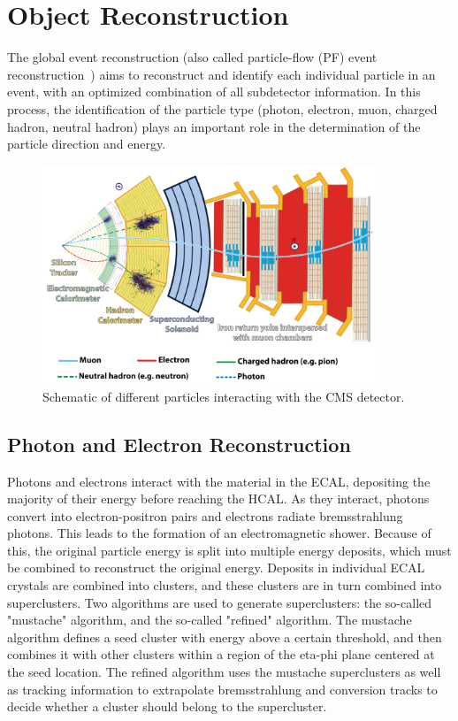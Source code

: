 \section{Object Reconstruction}
The global event reconstruction (also called particle-flow (PF) event reconstruction~\cite{CMS:2017yfk}) aims to reconstruct and identify each individual particle in an event, with an optimized combination of all subdetector information. In this process, the identification of the particle type (photon, electron, muon, charged hadron, neutral hadron) plays an important role in the determination of the particle direction and energy.

\begin{figure}[tb]
  \centering
   \includegraphics[width=0.9\textwidth]{fig/experiment/reconstruction/cms_detector.png}
	\caption{Schematic of different particles interacting with the CMS detector.}
\end{figure}

\subsection{Photon and Electron Reconstruction}
Photons and electrons interact with the material in the ECAL, depositing the majority of their energy before reaching the HCAL. As they interact, photons convert into 
electron-positron pairs and electrons radiate bremsstrahlung photons. This leads to the formation of an electromagnetic shower. Because of this, the original particle energy 
is split into multiple energy deposits, which must be combined to reconstruct the original energy. Deposits in individual ECAL crystals are combined into clusters, 
and these clusters are in turn combined into superclusters. Two algorithms are used to generate superclusters: the so-called "mustache" algorithm, and the so-called "refined" algorithm.
The mustache algorithm defines a seed cluster with energy above a certain threshold, and then combines it with other clusters within a region of the eta-phi plane centered at the 
seed location. The refined algorithm uses the mustache superclusters as well as tracking information to extrapolate bremsstrahlung and conversion tracks to decide whether a cluster should belong 
to the supercluster. 

